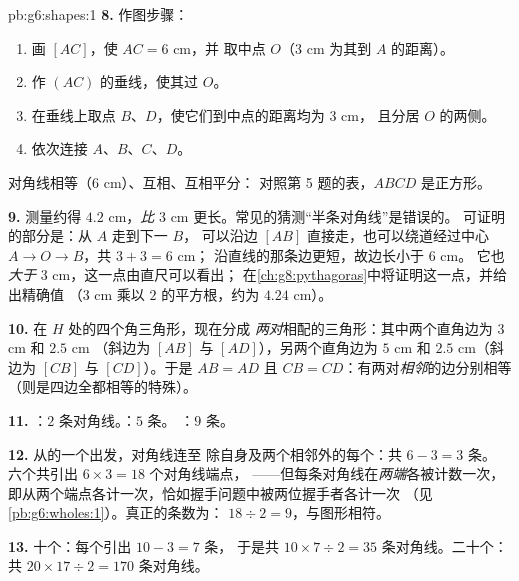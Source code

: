 \begin{solution}{pb:g6:shapes:1}
\textbf{8.} 作图步骤：
\begin{enumerate}
  \item 画 $[AC]$，使 $AC = 6$ cm，并
        取中点 $O$（$3$ cm 为其到 $A$ 的距离）。
  \item 作 $(AC)$ 的垂线，使其过 $O$。
  \item 在垂线上取点 $B$、$D$，使它们到中点的距离均为 $3$ cm，
        且分居 $O$ 的两侧。
  \item 依次连接 $A$、$B$、$C$、$D$。
\end{enumerate}
对角线相等（$6$ cm）、互相、互相平分：
对照第 5 题的表，$ABCD$ 是正方形。

\textbf{9.} 测量约得 $4.2$ cm，\emph{比}
$3$ cm 更长。常见的猜测“半条对角线”是错误的。
可证明的部分是：从 $A$ 走到下一 $B$，
可以沿边 $[AB]$ 直接走，也可以绕道经过中心
$A \to O \to B$，共 $3 + 3 = 6$ cm；
沿直线的那条边更短，故边长小于 $6$ cm。
它也\emph{大于} $3$ cm，这一点由直尺可以看出；
在\cref{ch:g8:pythagoras}中将证明这一点，并给出精确值
（$3$ cm 乘以 $2$ 的平方根，约为 $4.24$ cm）。

\textbf{10.} 在 $H$ 处的四个角三角形，现在分成
\emph{两对}相配的三角形：其中两个直角边为 $3$ cm 和 $2.5$ cm
（斜边为 $[AB]$ 与 $[AD]$），另两个直角边为 $5$ cm 和
$2.5$ cm（斜边为 $[CB]$ 与 $[CD]$）。于是 $AB = AD$ 且
$CB = CD$：有两对\emph{相邻}的边分别相等
（则是四边全都相等的特殊）。

\textbf{11.} ：$2$ 条对角线。：$5$ 条。
：$9$ 条。

\textbf{12.} 从的一个出发，对角线连至
除自身及两个相邻外的每个：共 $6 - 3 = 3$ 条。
六个共引出 $6 \times 3 = 18$ 个对角线端点，
——但每条对角线在\emph{两端}各被计数一次，
即从两个端点各计一次，恰如握手问题中被两位握手者各计一次
（见\cref{pb:g6:wholes:1}）。真正的条数为：
$18 \div 2 = 9$，与图形相符。

\textbf{13.} 十个：每个引出 $10 - 3 = 7$ 条，
于是共 $10 \times 7 \div 2 = 35$ 条对角线。二十个：
共 $20 \times 17 \div 2 = 170$ 条对角线。


\end{solution}
